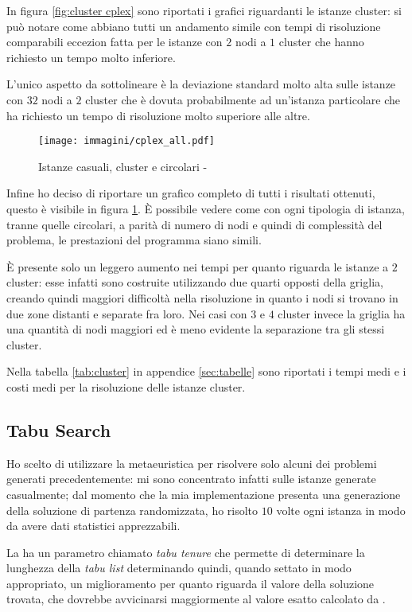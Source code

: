 In figura \ref{fig:cluster cplex} sono riportati i grafici riguardanti le istanze cluster: si può notare come abbiano tutti un andamento simile con tempi di risoluzione comparabili eccezion fatta per le istanze con $2$ nodi a $1$ cluster che hanno richiesto un tempo molto inferiore.

L'unico aspetto da sottolineare è la deviazione standard molto alta sulle istanze con $32$ nodi a $2$ cluster che è dovuta probabilmente ad un'istanza particolare che ha richiesto un tempo di risoluzione molto superiore alle altre.

\begin{figure}[htb]
	\centering
	\texttt{[image: immagini/cplex\_all.pdf]}
	\caption{Istanze casuali, cluster e circolari - }
	\label{fig:all cplex}
\end{figure}

Infine ho deciso di riportare un grafico completo di tutti i risultati ottenuti, questo è visibile in figura \ref{fig:all cplex}.
È possibile vedere come con ogni tipologia di istanza, tranne quelle circolari, a parità di numero di nodi e quindi di complessità del problema, le prestazioni del programma siano simili.

È presente solo un leggero aumento nei tempi per quanto riguarda le istanze a $2$ cluster: esse infatti sono costruite utilizzando due quarti opposti della griglia, creando quindi maggiori difficoltà nella risoluzione in quanto i nodi si trovano in due zone distanti e separate fra loro.
Nei casi con $3$ e $4$ cluster invece la griglia ha una quantità di nodi maggiori ed è meno evidente la separazione tra gli stessi cluster.

Nella tabella \ref{tab:cluster} in appendice \ref{sec:tabelle} sono riportati i tempi medi e i costi medi per la risoluzione delle istanze cluster.

\subsection{Tabu Search}

Ho scelto di utilizzare la metaeuristica \tabu per risolvere solo alcuni dei problemi generati precedentemente: mi sono concentrato infatti sulle istanze generate casualmente; dal momento che la mia implementazione presenta una generazione della soluzione di partenza randomizzata, ho risolto $10$ volte ogni istanza in modo da avere dati statistici apprezzabili.

La \tabu ha un parametro chiamato \emph{tabu tenure} che permette di determinare la lunghezza della \emph{tabu list} determinando quindi, quando settato in modo appropriato, un miglioramento per quanto riguarda il valore della soluzione trovata, che dovrebbe avvicinarsi maggiormente al valore esatto calcolato da .

